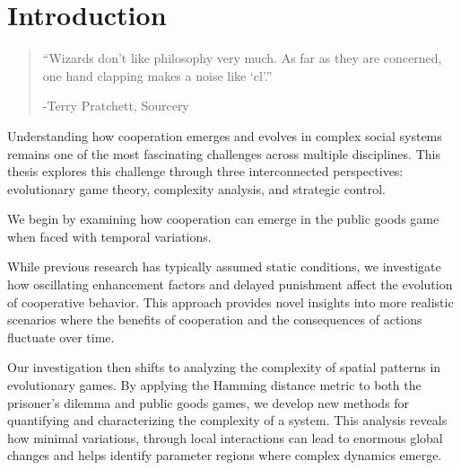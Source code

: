 \chapter{Introduction}
\label{chap:Intro}

\begin{quotation}

\vspace{-3cm}

\begin{flushright}
\begin{minipage}[t][5cm][b]{0.5\textwidth}
{ ``Wizards don’t like philosophy very much. As far as they are concerned, one hand clapping makes a noise like `cl'.''}

\bigskip

-{\small  Terry Pratchett, Sourcery }
\end{minipage}
\end{flushright}

\vspace{0.5cm}

\end{quotation}




Understanding how cooperation emerges and evolves in complex social systems remains one of the most fascinating challenges across multiple disciplines. This thesis explores this challenge through three interconnected perspectives: evolutionary game theory, complexity analysis, and strategic control.



We begin by examining how cooperation can emerge in the public goods game when faced with temporal variations.

 While previous research has typically assumed static conditions, we investigate how oscillating enhancement factors and delayed punishment affect the evolution of cooperative behavior. This approach provides novel insights into more realistic scenarios where the benefits of cooperation and the consequences of actions fluctuate over time.


Our investigation then shifts to analyzing the complexity of spatial patterns in evolutionary games. By applying the Hamming distance metric to both the prisoner's dilemma and public goods games, we develop new methods for quantifying and characterizing the complexity of a system. This analysis reveals how minimal variations, through local interactions can lead to enormous global changes and helps identify parameter regions where complex dynamics emerge.

